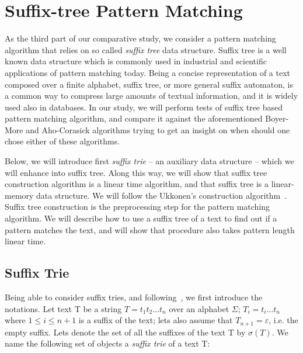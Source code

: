 \documentclass[paper=a4, fontsize=11pt]{scrartcl} %
\numberwithin{equation}{section} %
\numberwithin{figure}{section} %
\numberwithin{table}{section} %
\begin{document}
\section{Suffix-tree Pattern Matching}
As the third part of our comparative study, we consider a pattern matching algorithm that relies on so called \textit{suffix tree} data structure. Suffix tree is a well known data structure which is commonly used in industrial and scientific applications of pattern matching today. Being a concise representation of a text composed over a finite alphabet, suffix tree, or more general suffix automaton, is a common way to compress large amounts of textual information, and it is widely used also in databases. In our study, we will perform tests of suffix tree based pattern matching algorithm, and compare it against the aforementioned Boyer-More and Aho-Corasick algorithms trying to get an insight on when should one chose either of these algorithms.

Below, we will introduce first \textit{suffix trie} -- an auxiliary data structure -- which we will enhance into suffix tree. Along this way, we will show that suffix tree construction algorithm is a linear time algorithm, and that suffix tree is a linear-memory data structure. We will follow the Ukkonen's construction algorithm~\cite{ukkonen1995line}. Suffix tree construction is the preprocessing step for the pattern matching algorithm. We will describe how to use a suffix tree of a text to find out if a pattern matches the text, and will show that procedure also takes pattern length linear time.

\subsection{Suffix Trie}
\par Being able to consider suffix tries, and following~\cite{ukkonen1995line}, we first introduce the notations. Let text T be a string $T = t_1 t_2 \dots t_n$ over an alphabet $\Sigma$; $T_i = t_i \dots t_n$ where $1 \leq i \leq n+1$ is a suffix of the text; lets also assume that $T_{n+1} = \varepsilon$, i.e. the empty suffix. Lets denote the set of all the suffixes of the text T by $\sigma(T)$. We name the following set of objects a \textit{suffix trie} of a text T:
\end{document}
